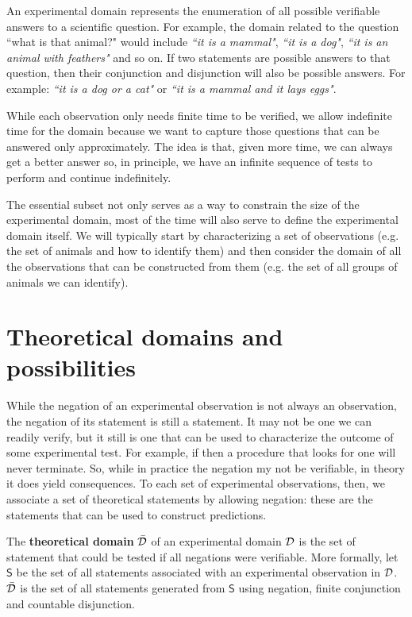 \documentclass[11pt,letterpaper,fleqn]{memoir} %
\begin{document}
An experimental domain represents the enumeration of all possible verifiable answers to a scientific question. For example, the domain related to the question ``what is that animal?" would include \emph{``it is a mammal"}, \emph{``it is a dog"}, \emph{``it is an animal with feathers"} and so on. If two statements are possible answers to that question, then their conjunction and disjunction will also be possible answers. For example: \emph{``it is a dog or a cat"} or \emph{``it is a mammal and it lays eggs"}.

While each observation only needs finite time to be verified, we allow indefinite time for the domain because we want to capture those questions that can be answered only approximately. The idea is that, given more time, we can always get a better answer so, in principle, we have an infinite sequence of tests to perform and continue indefinitely.

The essential subset not only serves as a way to constrain the size of the experimental domain, most of the time will also serve to define the experimental domain itself. We will typically start by characterizing a set of observations (e.g. the set of animals and how to identify them) and then consider the domain of all the observations that can be constructed from them (e.g. the set of all groups of animals we can identify).

\section{Theoretical domains and possibilities}


While the negation of an experimental observation is not always an observation, the negation of its statement is still a statement. It may not be one we can readily verify, but it still is one that can be used to characterize the outcome of some experimental test. For example, if  then a procedure that looks for one will never terminate. So, while in practice the negation my not be verifiable, in theory it does yield consequences. To each set of experimental observations, then, we associate a set of theoretical statements by allowing negation: these are the statements that can be used to construct predictions.

\begin{mathSection}
\begin{defn}
	The \textbf{theoretical domain} $\bar{\mathcal{D}}$ of an experimental domain $\mathcal{D}$ is the set of statement that could be tested if all negations were verifiable. More formally, let $\mathsf{S}$ be the set of all statements associated with an experimental observation in $\mathcal{D}$. $\bar{\mathcal{D}}$ is the set of all statements generated from $\mathsf{S}$ using negation, finite conjunction and countable disjunction.
\end{defn}
\end{mathSection}
\end{document}
